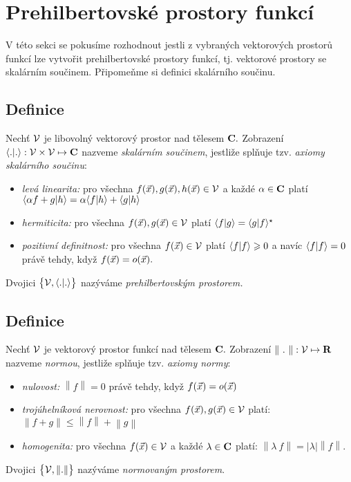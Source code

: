 \section{Prehilbertovsk\'e prostory funkc\'i}

V této sekci se pokusíme rozhodnout jestli z vybraných vektorových prostorů funkcí lze vytvořit prehilbertovské prostory funkcí, tj. vektorové prostory se skalárním součinem. Připomeňme si definici skalárního součinu.


\subsection{Definice}

Nechť ${\mathcal V}$ je libovoln\'y vektorov\'y prostor nad t\v elesem
${\mathbf C}.$ Zobrazen\'i $\langle . | . \rangle: {\mathcal V}\times {\mathcal V}\mapsto{\mathbf C}$ nazveme
\emph{skal\'arn\'im sou\v cinem},
jestli\v ze spl\v nuje tzv. \emph{axiomy skal\'arn\'iho sou\v
cinu}:
\begin{itemize}
    \item \emph{lev\'a linearita:} pro v\v sechna $f({\vec{x}}) ,g({\vec{x}}),h({\vec{x}})\in {\mathcal V}$ a ka\v zd\'e $\alpha
\in {\mathbf C}$ plat\'i $\langle\alpha f+g|h\rangle=\alpha\langle f |h\rangle+\langle g
|h\rangle$
    \item \emph{hermiticita:} pro v\v sechna $f({\vec{x}}) ,g({\vec{x}})\in {\mathcal V}$ plat\'i $\langle f
|g\rangle=\langle g|f \rangle^\star$
    \item \emph{pozitivn\'i definitnost:} pro v\v sechna $f({\vec{x}}) \in {\mathcal V}$ plat\'i $\langle f|f \rangle\geqslant
0$ a nav\'ic $\langle f|f \rangle=0$ pr\'av\v e tehdy, kdy\v z $f({\vec{x}}) =o({\vec{x}}).$
\end{itemize}
%
Dvojici $\bigl\{{\mathcal V},\langle . | . \rangle\bigr\}$ naz\'yv\'ame
\emph{prehilbertovsk\'ym prostorem.}



\subsection{Definice}
Nechť ${\mathcal V}$ je vektorov\'y prostor funkc\'i nad t\v elesem ${\mathbf C}.$
Zobrazen\'i $\left\|~.~\right\|: {\mathcal V}\mapsto{\mathbf R}$ nazveme
\emph{normou}, jestli\v ze spl\v nuje tzv.
\emph{axiomy normy}:
\begin{itemize}
    \item \emph{nulovost:} $\left\|f \right\|=0$ pr\'av\v e tehdy, kdy\v z $f({\vec{x}}) =o({\vec{x}})$
    \item \emph{troj\'uheln\'ikov\'a nerovnost:} pro v\v sechna $f({\vec{x}}) ,g({\vec{x}})\in {\mathcal V}$ plat\'i: $\left\|f +g\right\|\leq\left\|f \right\|+\left\|g\right\|$
    \item \emph{homogenita:} pro v\v sechna $f({\vec{x}}) \in {\mathcal V}$ a ka\v zd\'e $\lambda\in{\mathbf C}$ plat\'i: $\left\|\lambda ~ f \right\|= \left|\lambda\right| \left\|f \right\|.$
\end{itemize}
%
Dvojici $\bigl\{{\mathcal V},\left\|.\right\|\bigr\}$ naz\'yv\'ame
\emph{normovan\'ym prostorem}.



